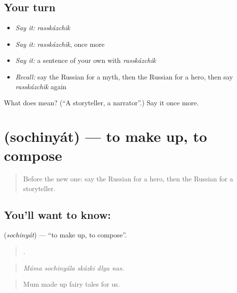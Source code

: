 \subsection*{Your turn}
\begin{itemize}
\raggedright
  \item \emph{Say it:} \emph{rasskázchik}
  \item \emph{Say it:} \emph{rasskázchik}, once more
  \item \emph{Say it:} a sentence of your own with \emph{rasskázchik}
  \item \emph{Recall:} say the Russian for a myth, then the Russian for a hero, then say \emph{rasskázchik} again
\end{itemize}

\begin{tcolorbox}[breakable,colback=teal!4,colframe=teal!35!black,title={Before you move on}]
What does  mean? (\textquotedblleft{}A storyteller, a narrator\textquotedblright{}.) Say it once more.
\end{tcolorbox}
\section[\texorpdfstring{\ru{сочинять} (sochinyát)}{сочинять (sochinyát)}]{ (sochinyát) — to make up, to compose}

\label{lesson:RU-C319-sochinyat}



\begin{quote}
Before the new one: say the Russian for a hero, then the Russian for a storyteller.
\end{quote}

\subsection*{You'll want to know: }
\textbf{} (\emph{sochinyát}) — \textquotedblleft{}to make up, to compose\textquotedblright{}.

\begin{quote}
    .
\end{quote}

\begin{quote}
\emph{Máma sochinyála skázki dlya nas.}
\end{quote}

\begin{quote}
Mum made up fairy tales for us.
\end{quote}

